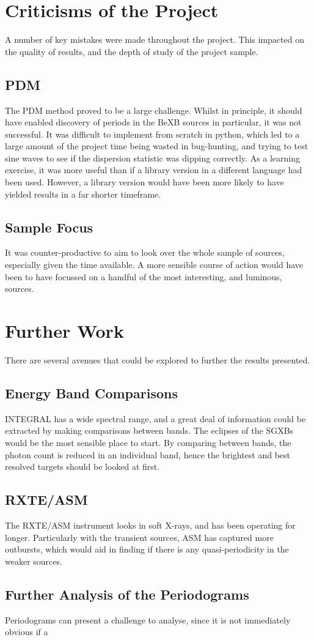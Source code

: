 \section{Criticisms of the Project}
A number of key mistakes were made throughout the project. This impacted on the quality of results, and the depth of study of the project sample. 

\subsection{PDM}
The PDM method proved to be a large challenge. Whilst in principle, it should have enabled discovery of periods in the BeXB sources in particular, it was not successful. It was difficult to implement from scratch in python, which led to a large amount of the project time being wasted in bug-hunting, and trying to test sine waves to see if the dispersion statistic was dipping correctly. As a learning exercise, it was more useful than if a library version in a different language had been used. However, a library version would have been more likely to have yielded results in a far shorter timeframe. 

\subsection{Sample Focus}
It was counter-productive to aim to look over the whole sample of sources, especially given the time available. A more sensible course of action would have been to have focussed on a handful of the most interesting, and luminous, sources. 


\section{Further Work}
There are several avenues that could be explored to further the results presented. 

\subsection{Energy Band Comparisons}
INTEGRAL has a wide spectral range, and a great deal of information could be extracted by making comparisons between bands. The eclipses of the SGXBs would be the most sensible place to start. By comparing between bands, the photon count is reduced in an individual band, hence the brightest and best resolved targets should be looked at first.

\subsection{RXTE/ASM}
The RXTE/ASM instrument looks in soft X-rays, and has been operating for longer. Particularly with the transient sources, ASM has captured more outbursts, which would aid in finding if there is any quasi-periodicity in the weaker sources. 

\subsection{Further Analysis of the Periodograms}
Periodograms can present a challenge to analyse, since it is not immediately obvious if a  

